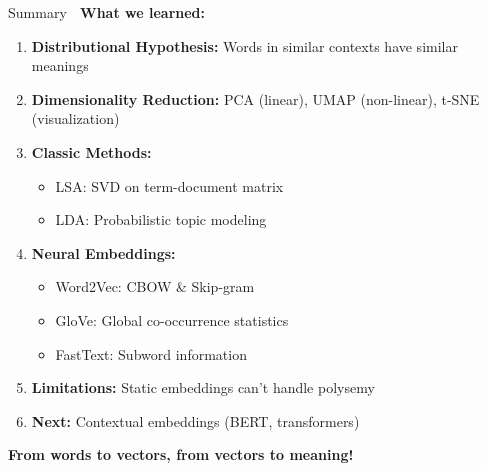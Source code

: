 \documentclass[aspectratio=169]{beamer}
\begin{document}
\begin{frame}[shrink=10]{Summary 🎯}
\textbf{What we learned:}

\begin{enumerate}\setlength{\itemsep}{0pt}
    \item \textbf{Distributional Hypothesis:} Words in similar contexts have similar meanings

    \item \textbf{Dimensionality Reduction:} PCA (linear), UMAP (non-linear), t-SNE (visualization)

    \item \textbf{Classic Methods:}
    \begin{itemize}\setlength{\itemsep}{0pt}
        \item LSA: SVD on term-document matrix
        \item LDA: Probabilistic topic modeling
    \end{itemize}

    \item \textbf{Neural Embeddings:}
    \begin{itemize}\setlength{\itemsep}{0pt}
        \item Word2Vec: CBOW \& Skip-gram
        \item GloVe: Global co-occurrence statistics
        \item FastText: Subword information
    \end{itemize}

    \item \textbf{Limitations:} Static embeddings can't handle polysemy

    \item \textbf{Next:} Contextual embeddings (BERT, transformers)
\end{enumerate}

\vspace{1em}
\begin{center}
\Large
\textbf{From words to vectors, from vectors to meaning! 🚀}
\end{center}
\end{frame}
\end{document}
